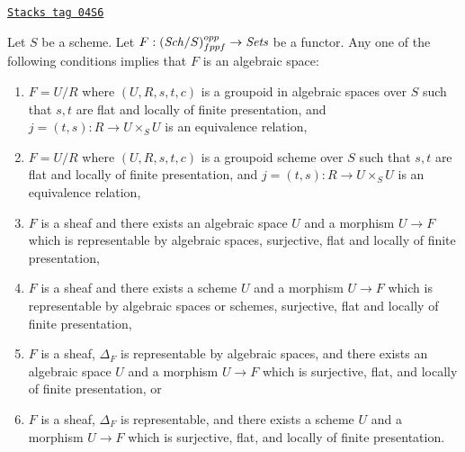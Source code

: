 \begin{theorem}
\label{bootstrap-theorem-final-bootstrap}
\href{https://stacks.math.columbia.edu/tag/04S6}{\texttt{Stacks tag 04S6}}

Let $S$ be a scheme.
Let $F : (\mathit{Sch}/S)_{fppf}^{opp} \to \textit{Sets}$ be a functor.
Any one of the following conditions implies that $F$ is an algebraic space:
\begin{enumerate}
\item $F = U/R$ where $(U, R, s, t, c)$ is a groupoid in algebraic spaces
over $S$ such that $s, t$ are flat and locally of finite presentation, and
$j = (t, s) : R \to U \times_S U$ is an equivalence relation,
\item $F = U/R$ where $(U, R, s, t, c)$ is a groupoid scheme
over $S$ such that $s, t$ are flat and locally of finite presentation, and
$j = (t, s) : R \to U \times_S U$ is an equivalence relation,
\item $F$ is a sheaf and there exists an algebraic space $U$ and a morphism
$U \to F$ which is representable by algebraic spaces,
surjective, flat and locally of finite presentation,
\item $F$ is a sheaf and there exists a scheme $U$ and a morphism
$U \to F$ which is representable by algebraic spaces or schemes,
surjective, flat and locally of finite presentation,
\item $F$ is a sheaf, $\Delta_F$ is representable by algebraic spaces,
and there exists an algebraic space $U$ and a morphism $U \to F$ which is
surjective, flat, and locally of finite presentation, or
\item $F$ is a sheaf, $\Delta_F$ is representable,
and there exists a scheme $U$ and a morphism $U \to F$ which is
surjective, flat, and locally of finite presentation.
\end{enumerate}
\end{theorem}


